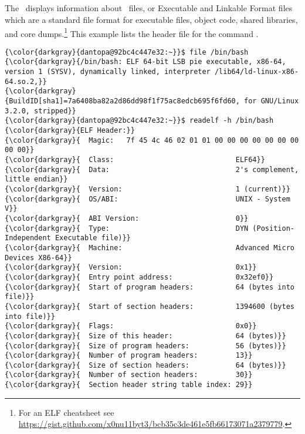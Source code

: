 % 

\subsection{\strace}
\label{sec:strace}
The  \ displays information about \elf \ files, or Executable and Linkable Format files which are a standard file format for executable files, object code, shared libraries, and core dumps.\footnote{For an ELF cheatsheet see \href{https://gist.github.com/x0nu11byt3/bcb35c3de461e5fb66173071a2379779}{https://gist.github.com/x0nu11byt3/bcb35c3de461e5fb66173071a2379779}.} This example lists the header file for the command .
{\footnotesize{
\begin{Verbatim}[commandchars=\\\{\}]
{\color{darkgray}{dantopa@92bc4c447e32:~}}$ file /bin/bash
{\color{darkgray}{/bin/bash: ELF 64-bit LSB pie executable, x86-64, version 1 (SYSV), dynamically linked, interpreter /lib64/ld-linux-x86-64.so.2,}} 
{\color{darkgray}{BuildID[sha1]=7a6408ba82a2d86dd98f1f75ac8edcb695f6fd60, for GNU/Linux 3.2.0, stripped}}
{\color{darkgray}{dantopa@92bc4c447e32:~}}$ readelf -h /bin/bash
{\color{darkgray}{ELF Header:}}
{\color{darkgray}{  Magic:   7f 45 4c 46 02 01 01 00 00 00 00 00 00 00 00 00}} 
{\color{darkgray}{  Class:                             ELF64}}
{\color{darkgray}{  Data:                              2's complement, little endian}}
{\color{darkgray}{  Version:                           1 (current)}}
{\color{darkgray}{  OS/ABI:                            UNIX - System V}}
{\color{darkgray}{  ABI Version:                       0}}
{\color{darkgray}{  Type:                              DYN (Position-Independent Executable file)}}
{\color{darkgray}{  Machine:                           Advanced Micro Devices X86-64}}
{\color{darkgray}{  Version:                           0x1}}
{\color{darkgray}{  Entry point address:               0x32ef0}}
{\color{darkgray}{  Start of program headers:          64 (bytes into file)}}
{\color{darkgray}{  Start of section headers:          1394600 (bytes into file)}}
{\color{darkgray}{  Flags:                             0x0}}
{\color{darkgray}{  Size of this header:               64 (bytes)}}
{\color{darkgray}{  Size of program headers:           56 (bytes)}}
{\color{darkgray}{  Number of program headers:         13}}
{\color{darkgray}{  Size of section headers:           64 (bytes)}}
{\color{darkgray}{  Number of section headers:         30}}
{\color{darkgray}{  Section header string table index: 29}}
\end{Verbatim}
}}

\endinput  %
